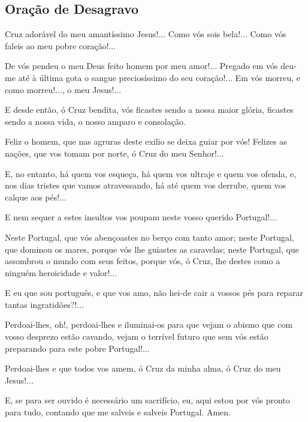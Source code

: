\subsection{Oração de Desagravo}
 Cruz adorável do meu amantíssimo Jesus!... Como vós sois bela!... Como vós faleis ao meu pobre coração!...\par
De vós pendeu o meu Deus feito homem por meu amor!... Pregado em vós deu-me até à última gota o sangue preciosíssimo do seu coração!... Em vós morreu, e como morreu!..., o meu Jesus!...\par
E desde então, ó Cruz bendita, vós ficastes sendo a nossa maior glória, ficastes sendo a nossa vida, o nosso amparo e consolação.\par
Feliz o homem, que nas agruras deste exilio se deixa guiar por vós! Felizes as nações, que vos tomam por norte, ó Cruz do meu Senhor!...\par
E, no entanto, há quem vos esqueça, há quem vos ultraje e quem vos ofenda, e, nos dias tristes que vamos atravessando, há até quem vos derrube, quem vos calque aos pés!...\par
E nem sequer a estes insultos vos poupam neste vosso querido Portugal!...\par
Neste Portugal, que vós abençoastes no berço com tanto amor; neste Portugal, que dominou os mares, porque vós lhe guiastes as caravelas; neste Portugal, que assombrou o mundo com seus feitos, porque vós, ó Cruz, lhe destes como a ninguém heroicidade e valor!...\par
E eu que sou português, e que vos amo, não hei-de cair a vossos pés para reparar tantas ingratidões?!...\par
Perdoai-lhes, oh!, perdoai-lhes e iluminai-os para que vejam o abismo que com vosso desprezo estão cavando, vejam o terrível futuro que sem vós estão preparando para este pobre Portugal!...\par
Perdoai-lhes e que todos vos amem, ó Cruz da minha alma, ó Cruz do meu Jesus!...\par
E, se para ser ouvido é necessário um sacrifício, eu, aqui estou por vós pronto para tudo, contando que me salveis e salveis Portugal. Amen.
